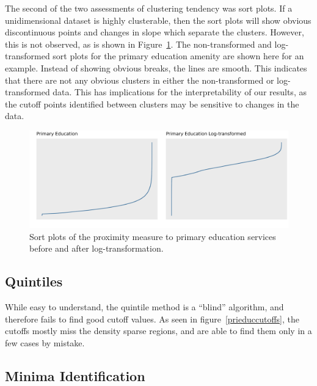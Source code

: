 \documentclass[11pt, a4paper]{article}
\begin{document}
The second of the two assessments of clustering tendency was sort plots. If a unidimensional dataset is highly clusterable, then the sort plots will show obvious discontinuous points and changes in slope which separate the clusters. However, this is not observed, as is shown in Figure~\ref{sortplotcompare}. The non-transformed and log-transformed sort plots for the primary education amenity are shown here for an example. Instead of showing obvious breaks, the lines are smooth. This indicates that there are not any obvious clusters in either the non-transformed or log-transformed data. This has implications for the interpretability of our results, as the cutoff points identified between clusters may be sensitive to changes in the data. 






\begin{figure}[H]
\centering
\includegraphics[width=\textwidth]{./sort_plot/sort_comparison.png}
\caption[Primary education sort plot]{Sort plots of the proximity measure to primary education services before and after log-transformation.}\label{sortplotcompare}
\end{figure}








\subsection{Quintiles}

While easy to understand, the quintile method is a ``blind'' algorithm, and therefore fails to find good cutoff values. As seen in figure~\ref{prieduccutoffs}, the cutoffs mostly miss the density sparse regions, and are able to find them only in a few cases by mistake. 






\subsection{Minima Identification}
\end{document}
